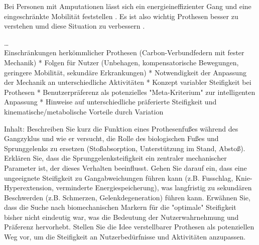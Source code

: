 Bei Personen mit Amputationen lässt sich ein energieineffizienter Gang und eine eingeschränkte Mobilität feststellen \cite{Major.2014}. Es ist also wichtig Prothesen besser zu verstehen umd diese Situation zu verbessern \cite{Major.2014}. 


\dots \\



Einschränkungen herkömmlicher Prothesen (Carbon-Verbundfedern mit fester Mechanik) *   Folgen für Nutzer (Unbehagen, kompensatorische Bewegungen, geringere Mobilität, sekundäre Erkrankungen) *   Notwendigkeit der Anpassung der Mechanik an unterschiedliche Aktivitäten *   Konzept variabler Steifigkeit bei Prothesen *   Benutzerpräferenz als potenzielles "Meta-Kriterium" zur intelligenten Anpassung *   Hinweise auf unterschiedliche präferierte Steifigkeit und kinematische/metabolische Vorteile durch Variation

Inhalt: Beschreiben Sie kurz die Funktion eines Prothesenfußes während des Gangzyklus und wie er versucht, die Rolle des biologischen Fußes und Sprunggelenks zu ersetzen (Stoßabsorption, Unterstützung im Stand, Abstoß). Erklären Sie, dass die Sprunggelenksteifigkeit ein zentraler mechanischer Parameter ist, der dieses Verhalten beeinflusst. Gehen Sie darauf ein, dass eine ungeeignete Steifigkeit zu Gangabweichungen führen kann (z.B. Fusschlag, Knie-Hyperextension, verminderte Energiespeicherung), was langfristig zu sekundären Beschwerden (z.B. Schmerzen, Gelenkdegeneration) führen kann. Erwähnen Sie, dass die Suche nach biomechanischen Markern für die "optimale" Steifigkeit bisher nicht eindeutig war, was die Bedeutung der Nutzerwahrnehmung und Präferenz hervorhebt. Stellen Sie die Idee verstellbarer Prothesen als potenziellen Weg vor, um die Steifigkeit an Nutzerbedürfnisse und Aktivitäten anzupassen.